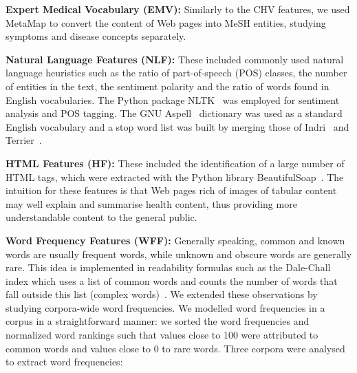\textbf{Expert Medical Vocabulary (EMV):}
Similarly to the CHV features, we used MetaMap to convert the content of Web pages into MeSH entities, studying symptoms and disease concepts separately. 



\textbf{Natural Language Features (NLF):}
These included commonly used natural language heuristics such as the ratio of part-of-speech (POS) classes, the number of entities in the text, the sentiment polarity and the ratio of words found in English vocabularies. The Python package NLTK~\cite{nltk} was employed for sentiment analysis and POS tagging. The GNU Aspell~\cite{aspell} dictionary was used as a standard English vocabulary and a stop word list was built by merging those of Indri~\cite{indri} and Terrier~\cite{terrier}. 



\textbf{HTML Features (HF):}
These included the identification of a large number of HTML tags, which were extracted with the Python library BeautifulSoap~\cite{bs4}. The intuition for these features is that Web pages rich of images of tabular content may well explain and summarise health content, thus providing more understandable content to the general public. 


\textbf{Word Frequency Features (WFF):}
Generally speaking, common and known words are usually frequent words, while unknown and obscure words are generally rare. This idea is implemented in readability formulas such as the Dale-Chall index which uses a list of common words and counts the number of words that fall outside this list (complex words)~\cite{dale48}.
We extended these observations by studying corpora-wide word frequencies. 
We modelled word frequencies in a corpus in a straightforward manner: we sorted the word frequencies and normalized word rankings such that values close to 100 were attributed to common words and values close to 0 to rare words. Three corpora were analysed to extract word frequencies:


